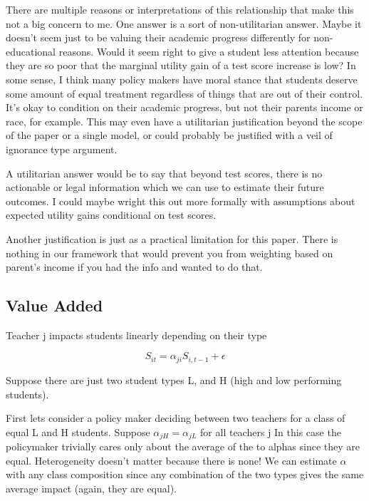 \documentclass[letterpaper,12pt]{article}
\begin{document}
There are multiple reasons or interpretations of this relationship that make this not a big concern to me. One answer is a sort of non-utilitarian answer. Maybe it doesn't seem just to be valuing their academic progress differently for non-educational reasons. Would it seem right to give a student less attention because they are so poor that the marginal utility gain of a test score increase is low? In some sense, I think many policy makers have moral stance that students deserve some amount of equal treatment regardless of things that are out of their control. It's okay to condition on their academic progress, but not their parents income or race, for example.  This may even have a utilitarian justification beyond the scope of the paper or a single model, or could probably be justified with a veil of ignorance type argument. 

A utilitarian answer would be to say that beyond test scores, there is no actionable or legal information which we can use to estimate their future outcomes. I could maybe wright this out more formally with assumptions about expected utility gains conditional on test scores. 

Another justification is just as a practical limitation for this paper. There is nothing in our framework that would prevent you from weighting based on parent's income if you had the info and wanted to do that. 

\subsection{Value Added }


Teacher j impacts students linearly depending on their type 

\begin{equation}
    S_{it} = \alpha_{ji}S_{i,t-1} + \epsilon
\end{equation}

Suppose there are just two student types L, and H (high and low performing students). 

First lets consider a policy maker deciding between two teachers for a class of equal L and H students. Suppose $\alpha_{jH} = \alpha_{jL}$ for all teachers j In this case the policymaker trivially cares only about the average of the to alphas since they are equal. Heterogeneity doesn't matter because there is none! We can estimate  $\alpha$ with any class composition since any combination of the two types gives the same average impact (again, they are equal). 
\end{document}
